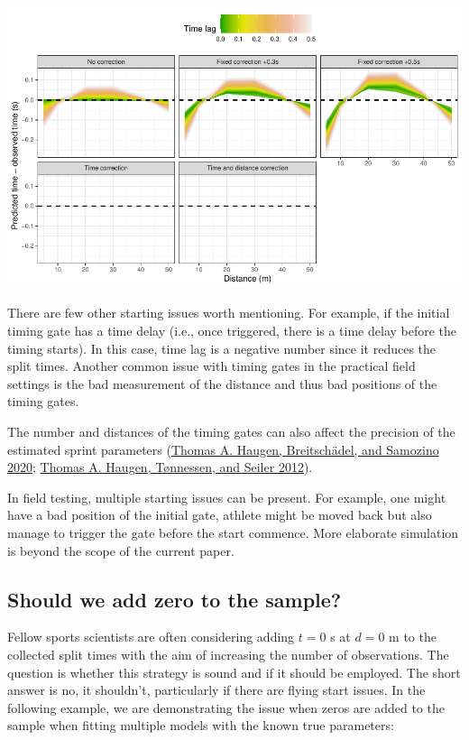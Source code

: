 \documentclass[fleqn,10pt,lineno]{wlpeerj} %
\begin{document}
\begin{center}\includegraphics[width=1\linewidth]{paper_files/figure-latex/unnamed-chunk-54-1} \end{center}

There are few other starting issues worth mentioning. For example, if the initial timing gate has a time delay (i.e., once triggered, there is a time delay before the timing starts). In this case, time lag is a negative number since it reduces the split times. Another common issue with timing gates in the practical field settings is the bad measurement of the distance and thus bad positions of the timing gates.

The number and distances of the timing gates can also affect the precision of the estimated sprint parameters (\protect\hyperlink{ref-haugenPowerForceVelocityProfilingSprinting2020}{Thomas A. Haugen, Breitschädel, and Samozino 2020}; \protect\hyperlink{ref-haugenDifferenceStartImpact2012}{Thomas A. Haugen, Tønnessen, and Seiler 2012}).

In field testing, multiple starting issues can be present. For example, one might have a bad position of the initial gate, athlete might be moved back but also manage to trigger the gate before the start commence. More elaborate simulation is beyond the scope of the current paper.

\hypertarget{should-we-add-zero-to-the-sample}{%
\subsection{Should we add zero to the sample?}\label{should-we-add-zero-to-the-sample}}

Fellow sports scientists are often considering adding \(t=0\) s at \(d=0\) m to the collected split times with the aim of increasing the number of observations. The question is whether this strategy is sound and if it should be employed. The short answer is no, it shouldn't, particularly if there are flying start issues. In the following example, we are demonstrating the issue when zeros are added to the sample when fitting multiple models with the known true parameters:
\end{document}
